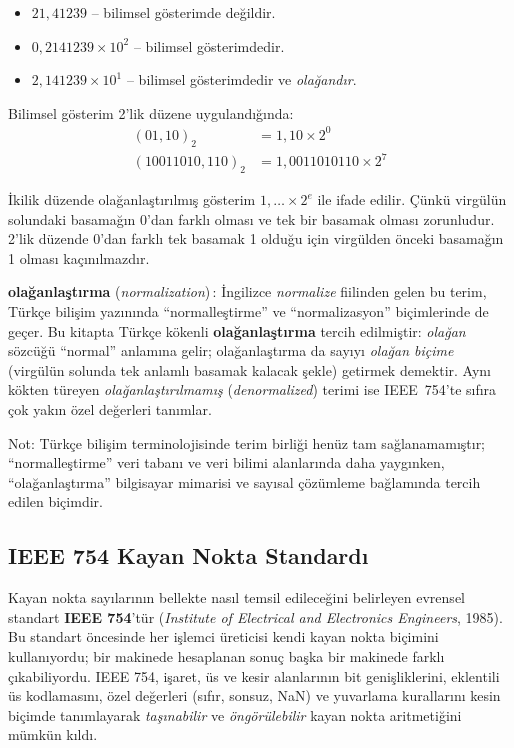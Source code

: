 \begin{itemize}
\item $21{,}41239$ -- bilimsel gösterimde değildir.
\item $0{,}2141239 \times 10^2$ -- bilimsel gösterimdedir.
\item $2{,}141239 \times 10^1$ -- bilimsel gösterimdedir ve \emph{olağandır}.
\end{itemize}

Bilimsel gösterim 2'lik düzene uygulandığında:
\begin{align*}
(01{,}10)_2 &= 1{,}10 \times 2^0 \\
(10011010{,}110)_2 &= 1{,}0011010110 \times 2^7
\end{align*}

İkilik düzende olağanlaştırılmış gösterim $1{,}\ldots \times 2^e$ ile ifade edilir. Çünkü virgülün solundaki basamağın 0'dan farklı olması ve tek bir basamak olması zorunludur. 2'lik düzende 0'dan farklı tek basamak 1 olduğu için virgülden önceki basamağın 1 olması kaçınılmazdır.

\begin{terimnotu}
\textbf{olağanlaştırma} (\emph{normalization})\,: İngilizce \emph{normalize} fiilinden gelen bu terim, Türkçe bilişim yazınında ``normalleştirme'' ve ``normalizasyon'' biçimlerinde de geçer. Bu kitapta Türkçe kökenli \textbf{olağanlaştırma} tercih edilmiştir: \emph{olağan} sözcüğü ``normal'' anlamına gelir; olağanlaştırma da sayıyı \emph{olağan biçime} (virgülün solunda tek anlamlı basamak kalacak şekle) getirmek demektir. Aynı kökten türeyen \emph{olağanlaştırılmamış} (\emph{denormalized}) terimi ise IEEE~754'te sıfıra çok yakın özel değerleri tanımlar.

Not: Türkçe bilişim terminolojisinde terim birliği henüz tam sağlanamamıştır; ``normalleştirme'' veri tabanı ve veri bilimi alanlarında daha yaygınken, ``olağanlaştırma'' bilgisayar mimarisi ve sayısal çözümleme bağlamında tercih edilen biçimdir.
\end{terimnotu}

\subsection{IEEE 754 Kayan Nokta Standardı}
\label{sec:ieee754}

Kayan nokta sayılarının bellekte nasıl temsil edileceğini belirleyen evrensel standart \textbf{IEEE 754}'tür (\emph{Institute of Electrical and Electronics Engineers}, 1985). Bu standart öncesinde her işlemci üreticisi kendi kayan nokta biçimini kullanıyordu; bir makinede hesaplanan sonuç başka bir makinede farklı çıkabiliyordu. IEEE 754, işaret, üs ve kesir alanlarının bit genişliklerini, eklentili üs kodlamasını, özel değerleri (sıfır, sonsuz, NaN) ve yuvarlama kurallarını kesin biçimde tanımlayarak \emph{taşınabilir} ve \emph{öngörülebilir} kayan nokta aritmetiğini mümkün kıldı.

